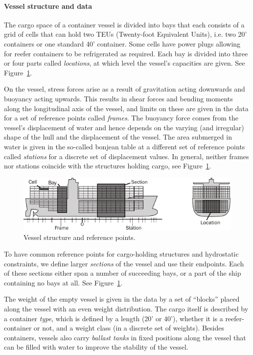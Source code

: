 \documentclass{llncs}
\begin{document}
\paragraph{Vessel structure and data}
The cargo space of a container vessel is divided into {bays} that each consists of a grid of {cells} that can hold two TEUs (Twenty-foot Equivalent Units), i.e. two 20' containers or one standard 40' container. Some cells have power plugs allowing for {reefer} containers to be refrigerated as required. Each bay is divided into three or four parts called \emph{locations}, at which level the vessel's capacities are given. See Figure~\ref{fig:vessel}.

On the vessel, stress forces arise as a result of gravitation acting downwards and buoyancy acting upwards. This results in shear forces and bending moments along the longitudinal axis of the vessel, and limits on these are given in the data for a set of reference points called \emph{frames}. The buoyancy force comes from the vessel's displacement of water and hence depends on the varying (and irregular) shape of the hull and the displacement of the vessel. The area submerged in water is given in the so-called bonjean table at a different set of reference points called \emph{stations} for a discrete set of displacement values. 
In general, neither frames nor stations coincide with the structures holding cargo, see Figure~\ref{fig:vessel}.

\begin{figure}[tb]
	\centering
		\includegraphics{figures/vessel4.pdf}
	\caption{Vessel structure and reference points.}
	\label{fig:vessel}
\end{figure}

To have common reference points for cargo-holding structures and hydrostatic constraints, we define larger \emph{sections} of the vessel and use their endpoints. Each of these sections either span a number of succeeding bays, or a part of the ship containing no bays at all.
See Figure~\ref{fig:vessel}.

The weight of the empty vessel is given in the data by a set of ``blocks'' placed along the vessel with an even weight distribution.
%
The cargo itself is described by a container \emph{type}, which is defined by a length (20' or 40'), whether it is a reefer-container or not, and a weight class (in a discrete set of weights). 
Besides containers, vessels also carry \emph{ballast tanks} in fixed positions along the vessel that can be filled with water to improve the stability of the vessel.
\end{document}
